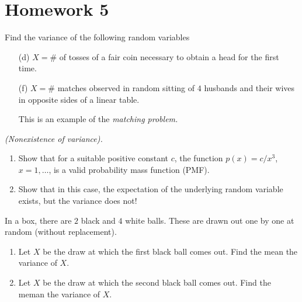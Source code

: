 \section{Homework 5}
\begin{problem}[Handout 7, \# 6(d, f)]
  Find the variance of the following random variables
  \begin{itemize}[noitemsep]
  \item[(d)] \(X=\#\) of tosses of a fair coin necessary to obtain a head
    for the first time.
  \item[(f)] \(X=\#\) matches observed in random sitting of \(4\) husbands
    and their wives in opposite sides of a linear table.

    This is an example of the \emph{matching problem.}
  \end{itemize}
\end{problem}
\begin{solution*}
\end{solution*}

\begin{problem}[Handout 7, \# 8]
  \emph{(Nonexistence of variance).}
  \begin{enumerate}[label=(\alph*),noitemsep]
  \item Show that for a suitable positive constant \(c\), the function
    \(p(x)=c/x^3\), \(x=1,\dots\), is a valid probability mass function
    (PMF).
  \item Show that in this case, the expectation of the underlying random
    variable exists, but the variance does not!
  \end{enumerate}
\end{problem}
\begin{solution*}
\end{solution*}

\begin{problem}[Handout 7, \# 9]
  In a box, there are \(2\) black and \(4\) white balls. These are drawn
  out one by one at random (without replacement).
  \begin{enumerate}[label=(\alph*),noitemsep]
  \item Let \(X\) be the draw at which the first black ball comes out. Find
    the mean the variance of \(X\).
  \item Let \(X\) be the draw at which the second black ball comes
    out. Find the meman the variance of \(X\).
  \end{enumerate}
\end{problem}
\begin{solution*}
\end{solution*}

